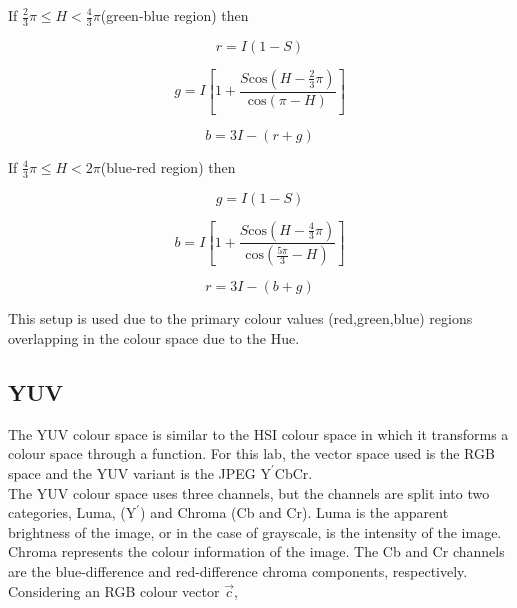 \documentclass{article}
\begin{document}
	If $\frac{2}{3}\pi \leq H < \frac{4}{3}\pi$(green-blue region) then
	
	\begin{equation}
	r = I(1 - S)
	\end{equation}
	
	\begin{equation}
	g = I\left[1 + \frac{S\textrm{cos}(H - \frac{2}{3}\pi)}{\textrm{cos}(\pi - H)}\right]
	\end{equation}
	
	\begin{equation}
	b = 3I - (r + g)
	\end{equation}
	
	If $\frac{4}{3}\pi \leq H < 2\pi$(blue-red region) then
	
	\begin{equation}
	g = I(1 - S)
	\end{equation}
	
	\begin{equation}
	b = I\left[1 + \frac{S\textrm{cos}(H - \frac{4}{3}\pi)}{\textrm{cos}(\frac{5\pi}{3} - H)}\right]
	\end{equation}
	
	\begin{equation}
	r = 3I - (b + g)
	\end{equation}
	
	This setup is used due to the primary colour values (red,green,blue) regions overlapping in the colour space due to the Hue.
	
	\subsection{YUV}
	
	The YUV colour space is similar to the HSI colour space in which it transforms a colour space through a function. For this lab, the vector space used is the RGB space and the YUV variant is the JPEG $\textrm{Y}^\prime$CbCr.\\
	
	The YUV colour space uses three channels, but the channels are split into two categories, Luma, ($\textrm{Y}^\prime$) and Chroma (Cb and Cr). Luma is the apparent brightness of the image, or in the case of grayscale, is the intensity of the image. Chroma represents the colour information of the image. The Cb and Cr channels are the blue-difference and red-difference chroma components, respectively.\\
	
	Considering an RGB colour vector $\vec{c}$,\\
	
\end{document}

